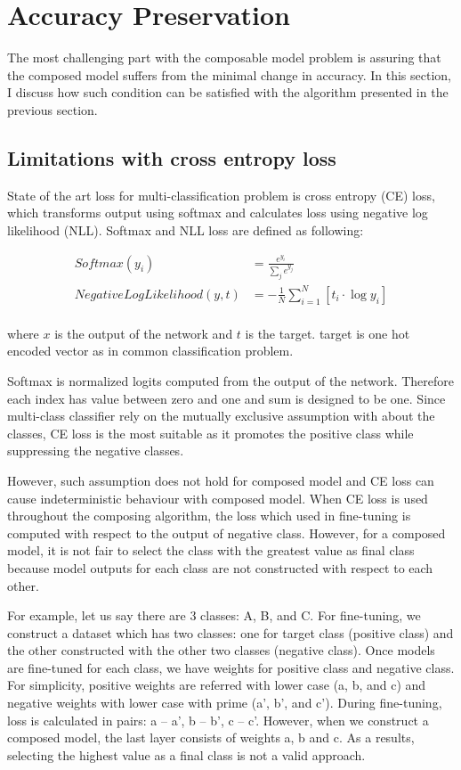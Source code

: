\documentclass{article}
\begin{document}
\section{Accuracy Preservation}

The most challenging part with the composable model problem is assuring that the composed model suffers from the minimal change in accuracy. In this section, I discuss how such condition can be satisfied with the algorithm presented in the previous section.

\subsection{Limitations with cross entropy loss}

State of the art loss for multi-classification problem is cross entropy (CE) loss, which transforms output using softmax and calculates loss using negative log likelihood (NLL).
Softmax and NLL loss are defined as following:

\begin{align*}
Softmax(y_i) &= \frac{e^{y_i}}{\sum_{j}e^{y_j}} \\
NegativeLogLikelihood(y, t) & = -\frac{1}{N}\sum_{i=1}^N \left[ t_i \cdot \log y_i\right] \\
\end{align*}

where $x$ is the output of the network and $t$ is the target. target is one hot encoded vector as in common classification problem.

Softmax is normalized logits computed from the output of the network. Therefore each index has value between zero and one and sum is designed to be one. Since multi-class classifier rely on the mutually exclusive assumption with about the classes, CE loss is the most suitable as it promotes the positive class while suppressing the negative classes.

However, such assumption does not hold for composed model and CE loss can cause indeterministic behaviour with composed model. When CE loss is used throughout the composing algorithm, the loss which used in fine-tuning is computed with respect to the output of negative class. However, for a composed model, it is not fair to select the class with the greatest value as final class because model outputs for each class are not constructed with respect to each other.

For example, let us say there are 3 classes: A, B, and C. For fine-tuning, we construct a dataset which has two classes: one for target class (positive class) and the other constructed with the other two classes (negative class). Once models are fine-tuned for each class, we have weights for positive class and negative class. For simplicity, positive weights are referred with lower case (a, b, and c) and negative weights with lower case with prime (a', b', and c'). During fine-tuning, loss is calculated in pairs: a -- a', b -- b', c -- c'. However, when we construct a composed model, the last layer consists of weights a, b and c. As a results, selecting the highest value as a final class is not a valid approach.
\end{document}
